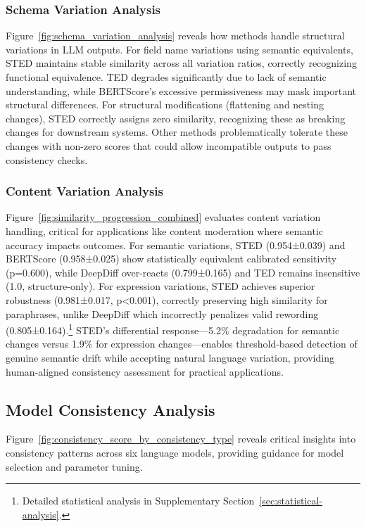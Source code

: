 \documentclass{article}
\begin{document}
\subsubsection{Schema Variation Analysis}
Figure~\ref{fig:schema_variation_analysis} reveals how methods handle structural variations in LLM outputs. For field name variations using semantic equivalents, STED maintains stable similarity across all variation ratios, correctly recognizing functional equivalence. TED degrades significantly due to lack of semantic understanding, while BERTScore's excessive permissiveness may mask important structural differences. For structural modifications (flattening and nesting changes), STED correctly assigns zero similarity, recognizing these as breaking changes for downstream systems. Other methods problematically tolerate these changes with non-zero scores that could allow incompatible outputs to pass consistency checks.

\subsubsection{Content Variation Analysis}
Figure~\ref{fig:similarity_progression_combined} evaluates content variation handling, critical for applications like content moderation where semantic accuracy impacts outcomes. For semantic variations, STED (0.954±0.039) and BERTScore (0.958±0.025) show statistically equivalent calibrated sensitivity (p=0.600), while DeepDiff over-reacts (0.799±0.165) and TED remains insensitive (1.0, structure-only). For expression variations, STED achieves superior robustness (0.981±0.017, p<0.001), correctly preserving high similarity for paraphrases, unlike DeepDiff which incorrectly penalizes valid rewording (0.805±0.164).\footnote{Detailed statistical analysis in Supplementary Section~\ref{sec:statistical-analysis}.} STED's differential response—5.2\% degradation for semantic changes versus 1.9\% for expression changes—enables threshold-based detection of genuine semantic drift while accepting natural language variation, providing human-aligned consistency assessment for practical applications.

\vspace{-3mm}
\subsection{Model Consistency Analysis}
\vspace{-3mm}
Figure~\ref{fig:consistency_score_by_consistency_type} reveals critical insights into consistency patterns across six language models, providing guidance for model selection and parameter tuning.
\end{document}
